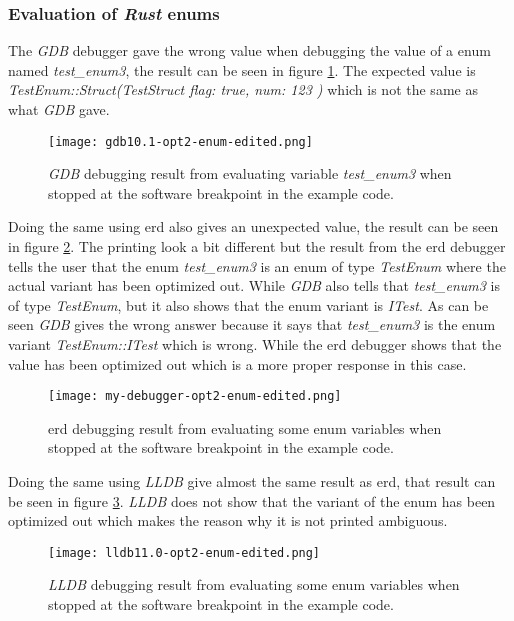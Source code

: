 \subsubsection{Evaluation of \emph{Rust} enums}
The \emph{GDB} debugger gave the wrong value when debugging the value of a enum named \emph{test\_enum3}, the result can be seen in figure \ref{fig:gdbenum}.
The expected value is \emph{TestEnum::Struct(TestStruct { flag: true, num: 123 })} which is not the same as what \emph{GDB} gave.


\begin{figure}[h]
	\centering
	\texttt{[image: gdb10.1-opt2-enum-edited.png]}
	\caption{\emph{GDB} debugging result from evaluating variable \emph{test\_enum3} when stopped at the software breakpoint in the example code.}
	\label{fig:gdbenum}
\end{figure}


Doing the same using \gls{erd} also gives an unexpected value, the result can be seen in  figure \ref{fig:mydebuggerenum}.
The printing look a bit different but the result from the \gls{erd} debugger tells the user that the enum \emph{test\_enum3} is an enum of type \emph{TestEnum} where the actual variant has been optimized out.
While \emph{GDB} also tells that \emph{test\_enum3} is of type \emph{TestEnum}, but it also shows that the enum variant is \emph{ITest}.
As can be seen \emph{GDB} gives the wrong answer because it says that \emph{test\_enum3} is the enum variant \emph{TestEnum::ITest} which is wrong.
While the \gls{erd} debugger shows that the value has been optimized out which is a more proper response in this case.


\begin{figure}[h]
	\centering
	\texttt{[image: my-debugger-opt2-enum-edited.png]}
	\caption{\acrshort{erd} debugging result from evaluating some enum variables when stopped at the software breakpoint in the example code.}
	\label{fig:mydebuggerenum}
\end{figure}


Doing the same using \emph{LLDB} give almost the same result as \gls{erd}, that result can be seen in figure \ref{fig:lldbenum}.
\emph{LLDB} does not show that the variant of the enum has been optimized out which makes the reason why it is not printed ambiguous.


\begin{figure}[h]
	\centering
	\texttt{[image: lldb11.0-opt2-enum-edited.png]}
	\caption{\emph{LLDB} debugging result from evaluating some enum variables when stopped at the software breakpoint in the example code.}
	\label{fig:lldbenum}
\end{figure}


